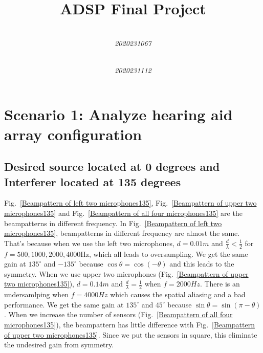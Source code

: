 \documentclass[onecolumn, conference]{IEEEtran}
\begin{document}
\title{ADSP Final Project}


\author{
 \\
\textit{2020231067}
\and
{} \\
\textit{2020231112}

}

\maketitle



\section{Scenario 1: Analyze hearing aid array configuration}
\subsection{Desired source located at 0 degrees and Interferer located at 135 degrees}

Fig.~\ref{Beampattern of left two microphones135}, Fig.~\ref{Beampattern of upper two microphones135} and Fig.~\ref{Beampattern of all four microphones135} are the beampatterns in different frequency.  In Fig.~\ref{Beampattern of left two microphones135}, beampatterns in different frequency are almost the same. That's because when we use the left two microphones, \(d=0.01m\) and \(\frac{d}{\lambda}<\frac{1}{2} \) for $f = 500,1000,2000,4000$Hz, which all leads to oversampling. We get the same gain at \(135^{\circ}\) and \(-135^{\circ}\) because \(\cos\theta = \cos(-\theta)\) and this leads to the symmetry. When we use upper two microphones (Fig.~\ref{Beampattern of upper two microphones135}), \(d=0.14m\) and \(\frac{d}{\lambda}=\frac{1}{2} \)  when \(f=2000Hz\). There is an undersamlping when \(f=4000Hz\) which causes the spatial aliasing and a bad performance. We get the same gain at \(135^{\circ}\) and \(45^{\circ}\) because \(\sin\theta = \sin(\pi-\theta)\). When we increase the number of sensors (Fig.~\ref{Beampattern of all four microphones135}), the beampattern has little difference with Fig.~\ref{Beampattern of upper two microphones135}. Since we put the sensors in square, this eliminate the undesired gain from symmetry.
\end{document}
